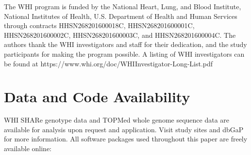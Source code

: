 \documentclass[12pt]{article}
\newcommand{\edit}[1]{{\color{red}{#1}}}
\begin{document}
The WHI program is funded by the National Heart, Lung, and Blood Institute, National Institutes of Health, U.S. Department of Health and Human Services through contracts HHSN268201600018C, HHSN268201600001C, HHSN268201600002C, HHSN268201600003C, and HHSN268201600004C. The authors thank the WHI investigators and staff for their dedication, and the study participants for making the program
possible. A listing of WHI investigators can be found at https://www.whi.org/doc/WHIInvestigator-Long-List.pdf

\noindent \edit{Sharon will add TOPMed acknowledgements and grant information.}

\noindent \edit{Please let me know if anyone would like me to add anything else.} 




\section{Data and Code Availability}



WHI SHARe genotype data and TOPMed whole genome sequence data are available for analysis upon request and application. Visit study sites and dbGaP for more information.
All software packages used throughout this paper are freely available online: 

\end{document}
